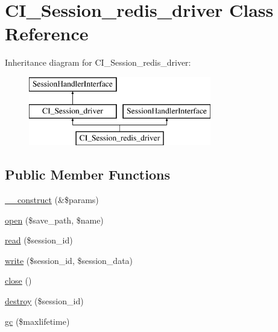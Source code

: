 \hypertarget{class_c_i___session__redis__driver}{}\section{C\+I\+\_\+\+Session\+\_\+redis\+\_\+driver Class Reference}
\label{class_c_i___session__redis__driver}
Inheritance diagram for C\+I\+\_\+\+Session\+\_\+redis\+\_\+driver\+:\begin{figure}[H]
\begin{center}
\leavevmode
\includegraphics[height=3.000000cm]{class_c_i___session__redis__driver}
\end{center}
\end{figure}
\subsection*{Public Member Functions}
\begin{DoxyCompactItemize}
\item 
\mbox{\hyperlink{class_c_i___session__redis__driver_ac1669c73d53d6f16cf5459a1e84d39c8}{\+\_\+\+\_\+construct}} (\&\$params)
\item 
\mbox{\hyperlink{class_c_i___session__redis__driver_a614b5cf3840833913c7a73260ed28e02}{open}} (\$save\+\_\+path, \$name)
\item 
\mbox{\hyperlink{class_c_i___session__redis__driver_a5bbf84ebf657be4eaccc0582377c76bf}{read}} (\$session\+\_\+id)
\item 
\mbox{\hyperlink{class_c_i___session__redis__driver_ad9d124885be93668f1dbf6aace5964f5}{write}} (\$session\+\_\+id, \$session\+\_\+data)
\item 
\mbox{\hyperlink{class_c_i___session__redis__driver_aa69c8bf1f1dcf4e72552efff1fe3e87e}{close}} ()
\item 
\mbox{\hyperlink{class_c_i___session__redis__driver_aaec5812f6b4eb6835f88d3baa06a002a}{destroy}} (\$session\+\_\+id)
\item 
\mbox{\hyperlink{class_c_i___session__redis__driver_a57aff7ee0656d8aa75d545fb8b3ae35d}{gc}} (\$maxlifetime)
\end{DoxyCompactItemize}
